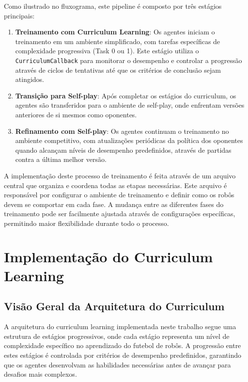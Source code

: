 Como ilustrado no fluxograma, este pipeline é composto por três estágios principais:

\begin{enumerate}
    \item \textbf{Treinamento com Curriculum Learning}: Os agentes iniciam o treinamento em um ambiente simplificado, com tarefas específicas de complexidade progressiva (Task 0 ou 1). Este estágio utiliza o \texttt{CurriculumCallback} para monitorar o desempenho e controlar a progressão através de ciclos de tentativas até que os critérios de conclusão sejam atingidos.
    
    \item \textbf{Transição para Self-play}: Após completar os estágios do curriculum, os agentes são transferidos para o ambiente de self-play, onde enfrentam versões anteriores de si mesmos como oponentes.
    
    \item \textbf{Refinamento com Self-play}: Os agentes continuam o treinamento no ambiente competitivo, com atualizações periódicas da política dos oponentes quando alcançam níveis de desempenho predefinidos, através de partidas contra a última melhor versão.
\end{enumerate}

A implementação deste processo de treinamento é feita através de um arquivo central que organiza e coordena todas as etapas necessárias. Este arquivo é responsável por configurar o ambiente de treinamento e definir como os robôs devem se comportar em cada fase. A mudança entre as diferentes fases do treinamento pode ser facilmente ajustada através de configurações específicas, permitindo maior flexibilidade durante todo o processo.

\section{Implementação do Curriculum Learning}
\label{sec:implementacao_cl}

\subsection{Visão Geral da Arquitetura do Curriculum}

A arquitetura do curriculum learning implementada neste trabalho segue uma estrutura de estágios progressivos, onde cada estágio representa um nível de complexidade específico no aprendizado do futebol de robôs. A progressão entre estes estágios é controlada por critérios de desempenho predefinidos, garantindo que os agentes desenvolvam as habilidades necessárias antes de avançar para desafios mais complexos.


